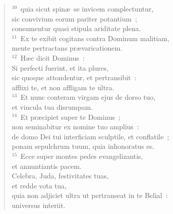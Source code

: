 \begin{flushleft}
\begin{verse}
${}^{10}$~quia sicut spin\ae\ se invicem complectuntur,\\ sic convivium eorum pariter potantium~;\\ consumentur quasi stipula ariditate plena.\\
${}^{11}$~Ex te exibit cogitans contra Dominum malitiam,\\ mente pertractans pr\ae varicationem.\\
${}^{12}$~H\ae c dicit Dominus~:\\ Si perfecti fuerint, et ita plures,\\ sic quoque attondentur, et pertransibit~:\\ afflixi te, et non affligam te ultra.\\
${}^{13}$~Et nunc conteram virgam ejus de dorso tuo,\\ et vincula tua disrumpam.\\
${}^{14}$~Et pr\ae cipiet super te Dominus~;\\ non seminabitur ex nomine tuo amplius~:\\ de domo Dei tui interficiam sculptile, et conflatile~;\\ ponam sepulchrum tuum, quia inhonoratus es.\\
${}^{15}$~Ecce super montes pedes evangelizantis,\\ et annuntiantis pacem.\\ Celebra, Juda, festivitates tuas,\\ et redde vota tua,\\ quia non adjiciet ultra ut pertranseat in te Belial~:\\ universus interiit.\end{verse}\end{flushleft}


